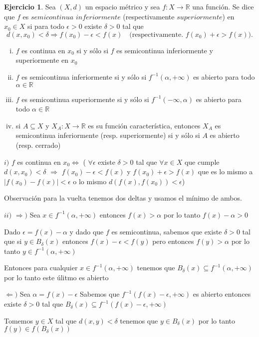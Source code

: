 \documentclass[12pt]{article}
\newcommand{\R}{\mathbb{R}}
\newcommand{\Ra}{\Rightarrow}
\newcommand{\ra}{\rightarrow}
\theoremstyle{definition}
\newtheorem{ej}{Ejercicio}
\begin{document}
 \begin{ej}
 Sea $(X,d)$ un espacio métrico y sea $f: X \ra \R$ una función. Se dice que $f$ es $semicontinua$ $inferiormente$ (respectivamente $superiormente$) en $x_0 \in X$ si para todo $\epsilon > 0$ existe $\delta >0$ tal que 
 $$ d(x,x_0) < \delta \Ra f(x_0) - \epsilon < f(x) \quad \text{(respectivamente. } f(x_0) + \epsilon > f(x) ). $$

 \begin{enumerate}[i.]
   \item $f$ es continua en $x_0$ si y sólo si $f$ es semicontinua inferiormente y superiormente en $x_0$
   \item $f$ es semicontinua inferiormente si y sólo si $f^{-1}(\alpha,+\infty)$ es abierto para todo $\alpha \in \R$
   \item $f$ es semicontinua superiormente si y sólo si $f^{-1}(-\infty,\alpha)$ es abierto para todo $\alpha \in \R$
   \item si $A \subseteq X$ y $X_A: X \ra \R$ es su función característica, entonces $X_A$ es semicontinua inferiormente (resp. superiormente) si y sólo si $A$ es abierto (resp. cerrado)
 \end{enumerate}
$i)$ $f$ es continua en $x_0 \iff$  ( $\forall \epsilon$ existe $\delta >0$ tal que $\forall x \in X$ que cumple $ d(x,x_0) < \delta $ $\Longrightarrow$ $f(x_0) - \epsilon < f(x)$ y $f(x_0) + \epsilon > f(x)$ que es lo mismo a $|f(x_0) - f(x)| < \epsilon$ o lo mismo $d(f(x),f(x_0)) < \epsilon$)

Observación para la vuelta tenemos dos deltas y usamos el mínimo de ambos. 

\noindent $ii)$ $\Ra )$ Sea $x \in f^{-1}(\alpha,+\infty)$ entonces $f(x) > \alpha$ por lo tanto $f(x) - \alpha > 0$

Dado $\epsilon = f(x) - \alpha$ y dado que $f$ es semicontinua, sabemos que existe $\delta >0$ tal que si $y \in B_{\delta}(x)$ entonces $f(x) - \epsilon < f(y)$ pero entonces $f(y) > \alpha$ por lo tanto $y \in f^{-1}(\alpha , +\infty)$ 

Entonces para cualquier $x \in f^{-1}(\alpha,+\infty)$ tenemos que $B_{\delta}(x) \subseteq f^{-1}(\alpha,+\infty)$ por lo tanto este úlitmo es abierto

$\Leftarrow )$ Sea $\alpha = f(x) - \epsilon $ Sabemos que $f^{-1}(f(x) - \epsilon,+\infty)$ es abierto entonces existe $\delta > 0$ tal que $B_{\delta}(x) \subseteq  f^{-1}(f(x) - \epsilon,+\infty)$

Tomemos $y \in X$ tal que $d(x,y) < \delta$ tenemos que $y \in B_{\delta}(x)$ por lo tanto $f(y )\in f(B_{\delta}(x))$


\end{ej}
\end{document}
